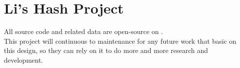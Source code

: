 \newpage
{}

\section{Li's Hash Project}

All source code and related data are open-source on \cite{web:lishash:home-page}.\\

This project will continuous to maintenance for any future work that basic on this design, so they can rely on it to do more and more research and development.\\

